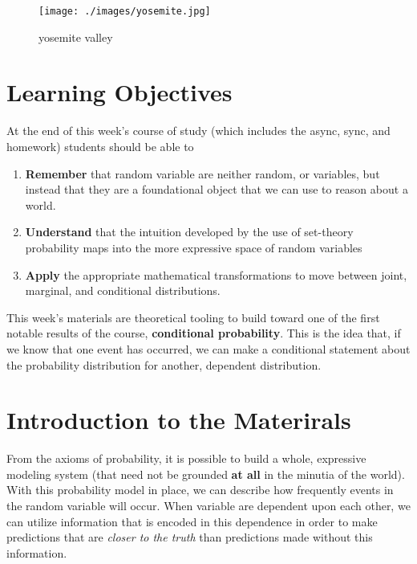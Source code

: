 \documentclass[
]{book}
\providecommand{\tightlist}{%
  \setlength{\itemsep}{0pt}\setlength{\parskip}{0pt}}
\theoremstyle{definition}
\theoremstyle{definition}
\theoremstyle{definition}
\theoremstyle{definition}
\theoremstyle{remark}
\begin{document}
\begin{figure}
\centering
\texttt{[image: ./images/yosemite.jpg]}
\caption{yosemite valley}
\end{figure}

\hypertarget{learning-objectives-1}{%
\section{Learning Objectives}\label{learning-objectives-1}}

At the end of this week's course of study (which includes the async, sync, and homework) students should be able to

\begin{enumerate}
\def\labelenumi{\arabic{enumi}.}
\tightlist
\item
  \textbf{Remember} that random variable are neither random, or variables, but instead that they are a foundational object that we can use to reason about a world.
\item
  \textbf{Understand} that the intuition developed by the use of set-theory probability maps into the more expressive space of random variables
\item
  \textbf{Apply} the appropriate mathematical transformations to move between joint, marginal, and conditional distributions.
\end{enumerate}

This week's materials are theoretical tooling to build toward one of the first notable results of the course, \textbf{conditional probability}. This is the idea that, if we know that one event has occurred, we can make a conditional statement about the probability distribution for another, dependent distribution.

\hypertarget{introduction-to-the-materirals}{%
\section{Introduction to the Materirals}\label{introduction-to-the-materirals}}

From the axioms of probability, it is possible to build a whole, expressive modeling system (that need not be grounded \textbf{at all} in the minutia of the world). With this probability model in place, we can describe how frequently events in the random variable will occur. When variable are dependent upon each other, we can utilize information that is encoded in this dependence in order to make predictions that are \emph{closer to the truth} than predictions made without this information.
\end{document}
